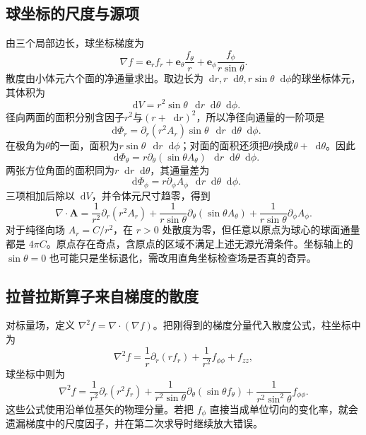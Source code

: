 \documentclass[11pt,openany,fontset=fandol]{ctexbook}
\theoremstyle{plain}\newtheorem{theorem}{定理}[chapter]\newtheorem{proposition}[theorem]{命题}
\theoremstyle{definition}\newtheorem{definition}{定义}[chapter]\newtheorem{example}{例}[chapter]
\theoremstyle{remark}\newtheorem*{remark}{说明}
\newcommand{\dd}{\mathop{}\!\mathrm d}\newcommand{\ii}{\mathrm i}\newcommand{\ee}{\mathrm e}
\newcommand{\vct}[1]{\bm{#1}}\newcommand{\Rea}{\operatorname{Re}}\newcommand{\Ima}{\operatorname{Im}}
\begin{document}
\subsection{球坐标的尺度与源项}
由三个局部边长，球坐标梯度为
\[
\nabla f=\vct e_r f_r+\vct e_\theta\frac{f_\theta}{r}+\vct e_\phi\frac{f_\phi}{r\sin\theta}.
\]
散度由小体元六个面的净通量求出。取边长为$\dd r,r\dd\theta,r\sin\theta\dd\phi$的球坐标体元，其体积为
\[
\dd V=r^2\sin\theta\,\dd r\dd\theta\dd\phi.
\]
径向两面的面积分别含因子$r^2$与$(r+\dd r)^2$，所以净径向通量的一阶项是
\[
\dd\Phi_r=\partial_r(r^2A_r)\sin\theta\,\dd r\dd\theta\dd\phi.
\]
在极角为$\theta$的一面，面积为$r\sin\theta\,\dd r\dd\phi$；对面的面积还须把$\theta$换成$\theta+\dd\theta$。因此
\[
\dd\Phi_\theta=r\partial_\theta(\sin\theta A_\theta)\,\dd r\dd\theta\dd\phi.
\]
两张方位角面的面积同为$r\dd r\dd\theta$，其通量差为
\[
\dd\Phi_\phi=r\partial_\phi A_\phi\,\dd r\dd\theta\dd\phi.
\]
三项相加后除以$\dd V$，并令体元尺寸趋零，得到
\[
\nabla\cdot\vct A=\frac1{r^2}\partial_r(r^2A_r)
+\frac1{r\sin\theta}\partial_\theta(\sin\theta A_\theta)
+\frac1{r\sin\theta}\partial_\phi A_\phi.
\]
对于纯径向场 $A_r=C/r^2$，在 $r>0$ 处散度为零，但任意以原点为球心的球面通量都是 $4\pi C$。原点存在奇点，含原点的区域不满足上述无源光滑条件。坐标轴上的 $\sin\theta=0$ 也可能只是坐标退化，需改用直角坐标检查场是否真的奇异。

\subsection{拉普拉斯算子来自梯度的散度}
对标量场，定义 $\nabla^2f=\nabla\cdot(\nabla f)$。把刚得到的梯度分量代入散度公式，柱坐标中为
\begin{equation}
\nabla^2f=\frac1r\partial_r(rf_r)+\frac1{r^2}f_{\phi\phi}+f_{zz},
\end{equation}
球坐标中则为
\begin{equation}
\nabla^2f=\frac1{r^2}\partial_r(r^2f_r)
+\frac1{r^2\sin\theta}\partial_\theta(\sin\theta f_\theta)
+\frac1{r^2\sin^2\theta}f_{\phi\phi}.
\end{equation}
这些公式使用沿单位基矢的物理分量。若把 $f_\phi$ 直接当成单位切向的变化率，就会遗漏梯度中的尺度因子，并在第二次求导时继续放大错误。
\end{document}
